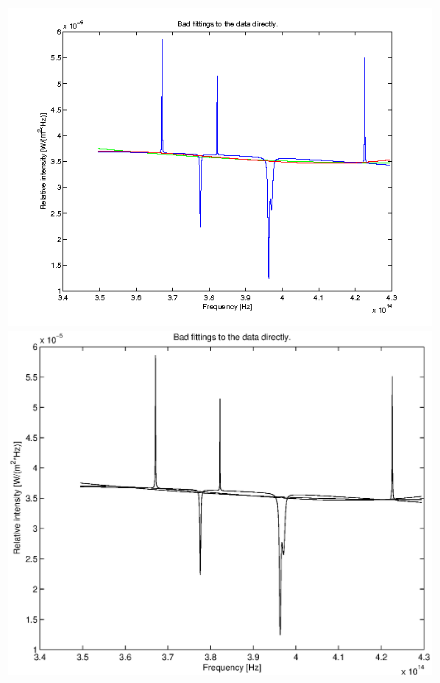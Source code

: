 \documentclass[10pt, a4paper]{article}
\begin{document}
\begin{figure}[hbt]
\begin{center}
\ifpdf
	\includegraphics[width=\linewidth]{../img/bad_fits.png}
\else
	\includegraphics[width=\linewidth]{../img/bad_fits.eps}
\fi
\end{center}
\caption{}
\label{fig:badfit}
\end{figure}
\end{document}
